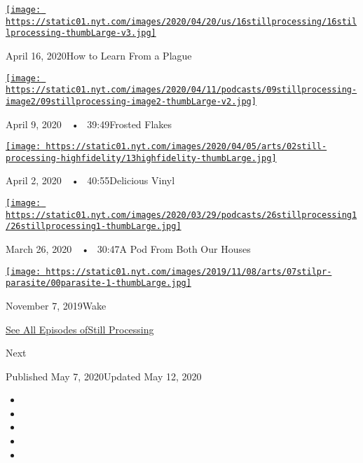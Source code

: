 \href{https://www.nytimes.com/2020/04/16/podcasts/still-processing-AIDS-survive-coronavirus.html?action=click\&module=audio-series-bar\&region=header\&pgtype=Article}{\texttt{[image: https://static01.nyt.com/images/2020/04/20/us/16stillprocessing/16stillprocessing-thumbLarge-v3.jpg]}}

April 16, 2020How to Learn From a Plague

\href{https://www.nytimes.com/2020/04/09/podcasts/still-processing-tiger-king.html?action=click\&module=audio-series-bar\&region=header\&pgtype=Article}{\texttt{[image: https://static01.nyt.com/images/2020/04/11/podcasts/09stillprocessing-image2/09stillprocessing-image2-thumbLarge-v2.jpg]}}

April 9, 2020~~•~ 39:49Frosted Flakes

\href{https://www.nytimes.com/2020/04/02/podcasts/high-fidelity-zoe-kravitz.html?action=click\&module=audio-series-bar\&region=header\&pgtype=Article}{\texttt{[image: https://static01.nyt.com/images/2020/04/05/arts/02still-processing-highfidelity/13highfidelity-thumbLarge.jpg]}}

April 2, 2020~~•~ 40:55Delicious Vinyl

\href{https://www.nytimes.com/2020/03/26/podcasts/still-processing-quarantine.html?action=click\&module=audio-series-bar\&region=header\&pgtype=Article}{\texttt{[image: https://static01.nyt.com/images/2020/03/29/podcasts/26stillprocessing1/26stillprocessing1-thumbLarge.jpg]}}

March 26, 2020~~•~ 30:47A Pod From Both Our Houses

\href{https://www.nytimes.com/2019/11/07/podcasts/still-processing-parasite-watchmen-bong-joon-ho.html?action=click\&module=audio-series-bar\&region=header\&pgtype=Article}{\texttt{[image: https://static01.nyt.com/images/2019/11/08/arts/07stilpr-parasite/00parasite-1-thumbLarge.jpg]}}

November 7, 2019Wake

\href{https://www.nytimes.com/column/still-processing-podcast}{See All
Episodes ofStill Processing}

Next

Published May 7, 2020Updated May 12, 2020

\begin{itemize}
\item
\item
\item
\item
\item
\end{itemize}

